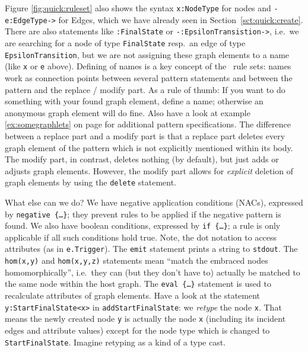 Figure \ref{fig:quick:ruleset} also shows the syntax \texttt{x:NodeType} for nodes and \texttt{-e:EdgeType->} for Edges, which we have already seen in Section~\ref{sct:quick:create}.
There are also statements like \texttt{:FinalState} or \texttt{-:EpsilonTransistion->}, i.e.\ we are searching for a node of type \texttt{FinalState} resp.\ an edge of type \texttt{EpsilonTransition}, but we are not assigning these graph elements to a name (like \texttt{x} or \texttt{e} above).
Defining of names is a key concept of the \GrG\ rule sets: names work as connection points between several pattern statements and between the pattern and the replace / modify part.
As a rule of thumb: If you want to do something with your found graph element, define a name; otherwise an anonymous graph element will do fine.
Also have a look at example \ref{ex:somegraphlets} on page \pageref{ex:somegraphlets} for additional pattern specifications.
The difference between a replace part and a modify part is that a replace part deletes every graph element of the pattern which is not explicitly mentioned within its body.
The modify part, in contrast, deletes nothing (by default), but just adds or adjusts graph elements.
However, the modify part allows for \emph{explicit} deletion of graph elements by using the \texttt{delete} statement.

What else can we do? 
We have negative application conditions (NACs), expressed by \texttt{negative \{\dots\}}; they prevent rules to be applied if the negative pattern is found.
We also have boolean conditions, expressed by \texttt{if \{\dots\}}; a rule is only applicable if all such conditions hold true.
Note, the dot notation to access attributes (as in \texttt{e.Trigger}).
The \texttt{emit} statement prints a string to \texttt{stdout}.
The \texttt{hom(x,y)} and \texttt{hom(x,y,z)} statements mean ``match the embraced nodes homomorphically'', i.e.\ they can (but they don't have to) actually be matched to the same node within the host graph.
The \texttt{eval \{\dots\}} statement is used to recalculate attributes of graph elements.
Have a look at the statement \texttt{y:StartFinalState<x>} in \texttt{addStartFinalState}: we \emph{retype} the node \texttt{x}.
That means the newly created node \texttt{y} is actually the node \texttt{x} (including its incident edges and attribute values) except for the node type which is changed to \texttt{StartFinalState}.
Imagine retyping as a kind of a type cast.

